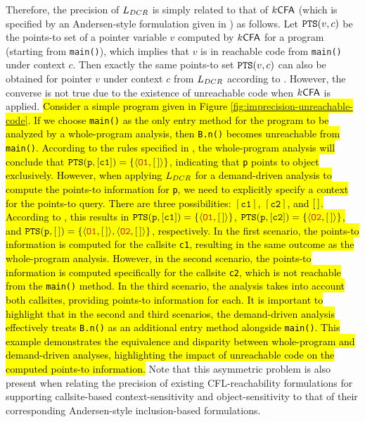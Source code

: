 Therefore, the precision of $\mbox{${L}_{DCR}$}$ is simply related to that of $\textsf{$k$CFA}$ (which is 
specified by an Andersen-style formulation given
in ) as follows. 
Let $\texttt{PTS}(v, c)$ be the points-to set of a pointer variable
$v$ computed by $\textsf{$k$CFA}$ for a program 
(starting from \texttt{main()}), which implies that $v$ is in reachable code from
\texttt{main()} under context $c$.
Then exactly the same points-to set 
$\texttt{PTS}(v, c)$
can also be
obtained for pointer $v$ under context $c$
from $\mbox{${L}_{DCR}$}$ according to . However, the converse is not true due to 
the existence of unreachable code when $\textsf{$k$CFA}$ is applied. 
\hl{Consider a simple program given in Figure \ref{fig:imprecision-unreachable-code}. If we choose \texttt{main()} as the only entry method for the program to be analyzed by a whole-program analysis, then \texttt{B.n()} becomes unreachable from \texttt{main()}. According to the rules specified in , the whole-program analysis will conclude that $\texttt{PTS}(\texttt{p}, [\texttt{c1}])=\{\langle {\color{purple}\texttt{O1}}, [\,] \rangle \}$, indicating that \texttt{p} points to object  exclusively.
However, when applying $\mbox{${L}_{DCR}$}$ for a demand-driven analysis to compute the points-to information for \texttt{p}, we need to explicitly specify a context for the points-to query. There are three possibilities: $[\texttt{c1}]$, $[\texttt{c2}]$, and $[\,]$. 
According to ,
this results in $\texttt{PTS}(\texttt{p}, [\texttt{c1}])=\{\langle {\color{purple}\texttt{O1}}, [\,] \rangle\}$, $\texttt{PTS}(\texttt{p}, [\texttt{c2}])=\{\langle {\color{purple}\texttt{O2}}, [\,] \rangle \}$, 
and $\texttt{PTS}(\texttt{p}, [\,])=\{\langle {\color{purple}\texttt{O1}}, [\,] \rangle, \langle {\color{purple}\texttt{O2}}, [\,] \rangle\}$,
respectively.
In the first scenario, the points-to information is computed for the callsite \texttt{c1}, resulting in the same outcome as the whole-program analysis. However, in the second scenario, the points-to information is computed specifically for the callsite \texttt{c2}, which is not reachable from the \texttt{main()} method. In the third scenario, the analysis takes into account both callsites, providing points-to information for each. It is important to highlight that in the second and third scenarios, the demand-driven analysis effectively treats \texttt{B.n()} as an additional entry method alongside \texttt{main()}.
This example demonstrates the equivalence and disparity between whole-program and demand-driven analyses, highlighting the impact of unreachable code on the computed points-to information.
}
Note that this 
asymmetric problem is also present when relating the  precision of 
existing CFL-reachability formulations for supporting 
callsite-based context-sensitivity 
\cite{sridharan2006refinement,shang2012demand,yan2011demand}  and
object-sensitivity \cite{lu2019precision, lu2021eagle} to that of their 
corresponding Andersen-style inclusion-based formulations.

